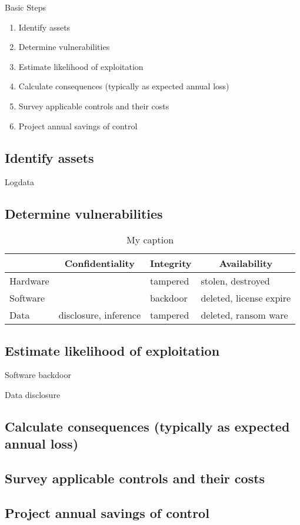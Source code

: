 Basic Steps
\begin{enumerate}
    \item Identify assets
    \item Determine vulnerabilities
    \item Estimate likelihood of exploitation
    \item Calculate consequences (typically as expected annual loss)
    \item Survey applicable controls and their costs
    \item Project annual savings of control
\end{enumerate}

\subsection{Identify assets}
Logdata

\subsection{Determine vulnerabilities}
\begin{table}[h!]
  \centering
  \caption{My caption}
  \label{my-label}
  \begin{tabular}{|l|lll|}
    \hline
    \multicolumn{1}{|c|}{} & \multicolumn{1}{c|}{Confidentiality} & \multicolumn{1}{c|}{Integrity} & \multicolumn{1}{c|}{Availability} \\ \hline
    Hardware               &                                      & tampered                       & stolen, destroyed                 \\ \cline{1-1}
    Software               &                                      & backdoor                       & deleted, license expire           \\ \cline{1-1}
    Data                   & disclosure, inference                & tampered                       & deleted, ransom ware              \\ \hline
  \end{tabular}
\end{table}

\subsection{Estimate likelihood of exploitation}
Software backdoor

Data disclosure

\subsection{Calculate consequences (typically as expected annual loss)}
\subsection{Survey applicable controls and their costs}
\subsection{Project annual savings of control}
